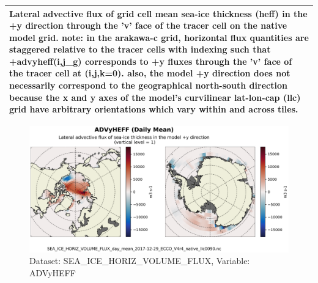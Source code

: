 \begin{longtable}{|m{}|m{}|m{}|m{}|}
\multicolumn{4}{|p{1\textwidth}|}{\footnotesize{{Lateral advective flux of grid cell mean sea-ice thickness (heff) in the +y direction through the 'v' face of the tracer cell on the native model grid. note: in the arakawa-c grid, horizontal flux quantities are staggered relative to the tracer cells with indexing such that +advyheff(i,j\_g) corresponds to +y fluxes through the 'v' face of the tracer cell at (i,j,k=0). also, the model +y direction does not necessarily correspond to the geographical north-south direction because the x and y axes of the model's curvilinear lat-lon-cap (llc) grid have arbitrary orientations which vary within and across tiles.}}} \\ \hline
\end{longtable}

\begin{figure}[H]
\centering
\includegraphics[scale=0.55]{../images/plots/native_plots/Sea-Ice_and_Snow_Horizontal_Volume_Fluxes/ADVyHEFF.png}
\caption{Dataset: SEA\_ICE\_HORIZ\_VOLUME\_FLUX, Variable: ADVyHEFF}
\label{tab:table-SEA_ICE_HORIZ_VOLUME_FLUX_ADVyHEFF-Plot}
\end{figure}
\newpage
\pagebreak
